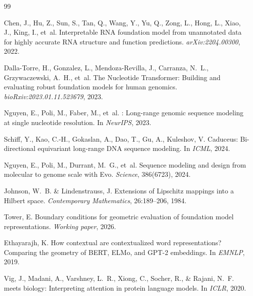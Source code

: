\documentclass[11pt]{article}
\begin{document}
\begin{thebibliography}{99}

Chen, J., Hu, Z., Sun, S., Tan, Q., Wang, Y., Yu, Q., Zong,
  L., Hong, L., Xiao, J., King, I., et~al.
\newblock Interpretable {RNA} foundation model from unannotated
  data for highly accurate {RNA} structure and function predictions.
\newblock \emph{arXiv:2204.00300}, 2022.

Dalla-Torre, H., Gonzalez, L., Mendoza-Revilla, J.,
  Carranza, N.~L., Grzywaczewski, A.~H., et~al.
\newblock The {Nucleotide Transformer}: Building and evaluating
  robust foundation models for human genomics.
\newblock \emph{bioRxiv:2023.01.11.523679}, 2023.

Nguyen, E., Poli, M., Faber, M., et~al.
: Long-range genomic sequence modeling at
  single nucleotide resolution.
\newblock In \emph{NeurIPS}, 2023.

Schiff, Y., Kao, C.-H., Gokaslan, A., Dao, T., Gu, A.,
  Kuleshov, V.
\newblock Caduceus: Bi-directional equivariant long-range {DNA}
  sequence modeling.
\newblock In \emph{ICML}, 2024.

Nguyen, E., Poli, M., Durrant, M.~G., et~al.
\newblock Sequence modeling and design from molecular to genome
  scale with {Evo}.
\newblock \emph{Science}, 386(6723), 2024.

Johnson, W.~B. \& Lindenstrauss, J.
\newblock Extensions of {L}ipschitz mappings into a {H}ilbert space.
\newblock \emph{Contemporary Mathematics}, 26:189--206, 1984.

Tower, E.
\newblock Boundary conditions for geometric evaluation of
  foundation model representations.
\newblock \emph{Working paper}, 2026.

Ethayarajh, K.
\newblock How contextual are contextualized word representations?
  {C}omparing the geometry of {BERT}, {ELMo}, and {GPT-2} embeddings.
\newblock In \emph{EMNLP}, 2019.

Vig, J., Madani, A., Varshney, L.~R., Xiong, C., Socher, R.,
  \& Rajani, N.~F.
 meets biology: Interpreting attention in
  protein language models.
\newblock In \emph{ICLR}, 2020.


\end{thebibliography}
\end{document}
